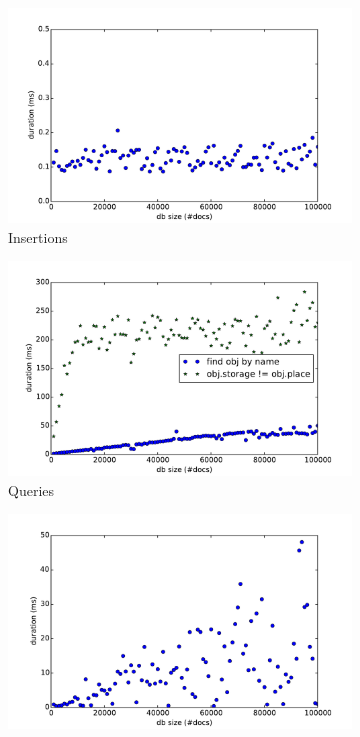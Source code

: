 \label{sec:insertions}
\begin{figure}[ht!]
  \centering
  \begin{subfigure}[b]{0.49\textwidth}
    \hspace{-8mm}
    \includegraphics[width=1.15\textwidth]{plots/insert-durations}
    \caption{Insertions}
    \label{fig:insert-durations}
  \end{subfigure}
  \begin{subfigure}[b]{0.49\textwidth}
    \hspace{-3mm}
    \includegraphics[width=1.15\textwidth]{plots/query-durations}
    \caption{Queries}
    \label{fig:query-durations}
  \end{subfigure}
  \begin{subfigure}[b]{0.49\textwidth}
    \hspace{-8mm}
    \includegraphics[width=1.15\textwidth]{plots/update-durations}

\end{subfigure}
\end{figure}
